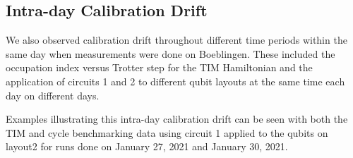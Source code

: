 


















\subsection{Intra-day Calibration Drift}
\label{intra-day-analysis}


We also observed calibration drift throughout different time periods within the same day when measurements were done on Boeblingen.  
These included the occupation index versus Trotter step for the TIM Hamiltonian and the application of circuits 1 and 2 to different qubit layouts at the same time each day on different days. 

Examples illustrating this intra-day calibration drift can be seen with both the TIM and cycle benchmarking data using circuit 1 applied to the qubits on layout2 for runs done on January 27, 2021 and January 30, 2021.  



